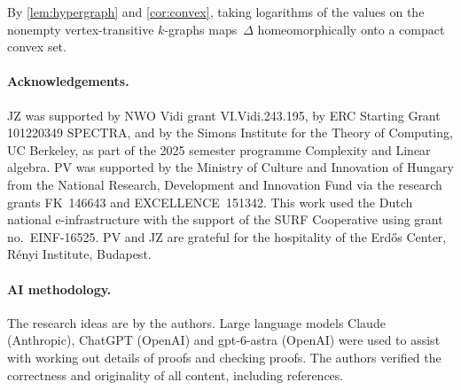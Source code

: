 \documentclass[11pt,letterpaper]{article}
\begin{document}
By \cref{lem:hypergraph} and \cref{cor:convex}, taking logarithms of the values on the nonempty vertex-transitive $k$-graphs maps~$\Delta$ homeomorphically onto a compact convex set.

\paragraph{Acknowledgements.} JZ was supported by NWO Vidi grant VI.Vidi.243.195, by ERC Starting Grant 101220349 SPECTRA, and by the Simons Institute for the Theory of Computing, UC Berkeley, as part of the 2025 semester programme Complexity and Linear algebra. PV was supported by the Ministry of Culture and Innovation of Hungary from the National Research, Development and Innovation Fund via the research grants FK~146643 and EXCELLENCE~151342. This work used the Dutch national e-infrastructure with the support of the SURF Cooperative using grant no.~EINF-16525. PV and JZ are grateful for the hospitality of the Erdős Center, Rényi Institute, Budapest.

\paragraph{AI methodology.} The research ideas are by the authors. Large language models Claude (Anthropic), ChatGPT (OpenAI) and gpt-6-astra (OpenAI) were used to assist with working out details of proofs and checking proofs. The authors verified the correctness and originality of all content, including references.
\end{document}
